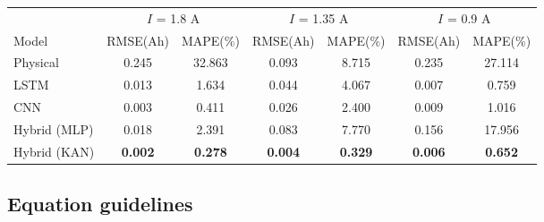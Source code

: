 \documentclass{jcd}
\theoremstyle{plain}
\theoremstyle{definition}
\begin{document}
\begin{strip}
  \centering\footnotesize
  \setlength{\tabcolsep}{10pt}
  \renewcommand{\captionwidth}{.805\textwidth}
  \begin{tabular}{@{} l *{6}{c}}
    \arrayrulecolor{main}
    \toprule
    \arrayrulecolor{gray}
    & \multicolumn{2}{c}{$I$ = 1.8 A} & \multicolumn{2}{c}{$I$ = 1.35 A} & \multicolumn{2}{c}{$I$ = 0.9 A}\\
      \cmidrule(r{3pt}){2-3}\cmidrule(l{3pt}r{3pt}){4-5}\cmidrule(l{3pt}){6-7}
    Model & RMSE(Ah) & MAPE(\%) & RMSE(Ah) & MAPE(\%) & RMSE(Ah) & MAPE(\%)\\ \midrule
    Physical & 0.245 & 32.863 & 0.093 & 8.715 & 0.235 & 27.114\\
    LSTM & 0.013 & 1.634 & 0.044 & 4.067 & 0.007 & 0.759\\
    CNN & 0.003 & 0.411 & 0.026 & 2.400 & 0.009 & 1.016\\
    Hybrid (MLP) & 0.018 & 2.391 & 0.083 & 7.770 & 0.156 & 17.956\\
    \arrayrulecolor{main}
    Hybrid (KAN) & \bfseries 0.002 & \bfseries 0.278 & \bfseries 0.004 & \bfseries 0.329 & \bfseries 0.006 & \bfseries 0.652\\ \bottomrule
  \end{tabular}
\end{strip}

\subsection{Equation guidelines}
\end{document}
